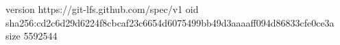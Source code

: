 version https://git-lfs.github.com/spec/v1
oid sha256:cd2c6d29d6224f8cbcaf23c6654d6075499bb49d3aaaaff094d86833cfe0ce3a
size 5592544
